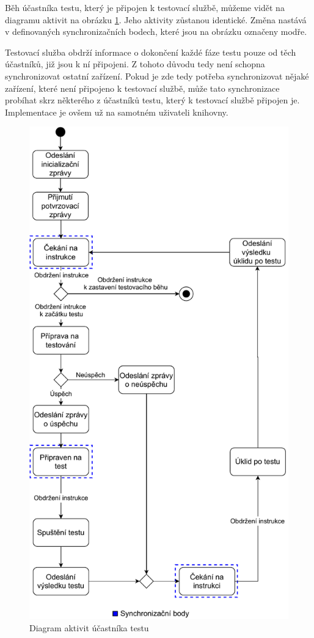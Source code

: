 Běh účastníka testu, který je připojen k testovací službě, můžeme vidět na diagramu aktivit na obrázku \ref{fig:act_diag_device}. Jeho aktivity zůstanou identické. Změna nastává v definovaných synchronizačních bodech, které jsou na obrázku označeny modře. 

Testovací služba obdrží informace o dokončení každé fáze testu pouze od těch účastníků, již jsou k ní připojeni. Z tohoto důvodu tedy není schopna synchronizovat ostatní zařízení. Pokud je zde tedy potřeba synchronizovat nějaké zařízení, které není připojeno k testovací službě, může tato synchronizace probíhat skrz některého z účastníků testu, který k testovací službě připojen je. Implementace je ovšem už na samotném uživateli knihovny.

\begin{figure}[H]
    \centering 
    \includegraphics[height=0.85\textheight]{assets/img/bp_assets/activitydiagramdevice.pdf}
    \caption{Diagram aktivit účastníka testu}
    \label{fig:act_diag_device}
\end{figure}



